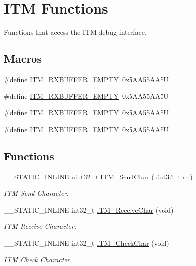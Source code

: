 \hypertarget{group___c_m_s_i_s__core___debug_functions}{\section{I\-T\-M Functions}
\label{group___c_m_s_i_s__core___debug_functions}
}


Functions that access the I\-T\-M debug interface.  


\subsection*{Macros}
\begin{DoxyCompactItemize}
\item 
\#define \hyperlink{group___c_m_s_i_s__core___debug_functions_gaa822cb398ee022b59e9e6c5d7bbb228a}{I\-T\-M\-\_\-\-R\-X\-B\-U\-F\-F\-E\-R\-\_\-\-E\-M\-P\-T\-Y}~0x5\-A\-A55\-A\-A5\-U
\item 
\#define \hyperlink{group___c_m_s_i_s__core___debug_functions_gaa822cb398ee022b59e9e6c5d7bbb228a}{I\-T\-M\-\_\-\-R\-X\-B\-U\-F\-F\-E\-R\-\_\-\-E\-M\-P\-T\-Y}~0x5\-A\-A55\-A\-A5\-U
\item 
\#define \hyperlink{group___c_m_s_i_s__core___debug_functions_gaa822cb398ee022b59e9e6c5d7bbb228a}{I\-T\-M\-\_\-\-R\-X\-B\-U\-F\-F\-E\-R\-\_\-\-E\-M\-P\-T\-Y}~0x5\-A\-A55\-A\-A5\-U
\item 
\#define \hyperlink{group___c_m_s_i_s__core___debug_functions_gaa822cb398ee022b59e9e6c5d7bbb228a}{I\-T\-M\-\_\-\-R\-X\-B\-U\-F\-F\-E\-R\-\_\-\-E\-M\-P\-T\-Y}~0x5\-A\-A55\-A\-A5\-U
\end{DoxyCompactItemize}
\subsection*{Functions}
\begin{DoxyCompactItemize}
\item 
\-\_\-\-\_\-\-S\-T\-A\-T\-I\-C\-\_\-\-I\-N\-L\-I\-N\-E uint32\-\_\-t \hyperlink{group___c_m_s_i_s__core___debug_functions_gac90a497bd64286b84552c2c553d3419e}{I\-T\-M\-\_\-\-Send\-Char} (uint32\-\_\-t ch)
\begin{DoxyCompactList}\small\item\em I\-T\-M Send Character. \end{DoxyCompactList}\item 
\-\_\-\-\_\-\-S\-T\-A\-T\-I\-C\-\_\-\-I\-N\-L\-I\-N\-E int32\-\_\-t \hyperlink{group___c_m_s_i_s__core___debug_functions_gac3ee2c30a1ac4ed34c8a866a17decd53}{I\-T\-M\-\_\-\-Receive\-Char} (void)
\begin{DoxyCompactList}\small\item\em I\-T\-M Receive Character. \end{DoxyCompactList}\item 
\-\_\-\-\_\-\-S\-T\-A\-T\-I\-C\-\_\-\-I\-N\-L\-I\-N\-E int32\-\_\-t \hyperlink{group___c_m_s_i_s__core___debug_functions_gae61ce9ca5917735325cd93b0fb21dd29}{I\-T\-M\-\_\-\-Check\-Char} (void)
\begin{DoxyCompactList}\small\item\em I\-T\-M Check Character. \end{DoxyCompactList}\end{DoxyCompactItemize}
